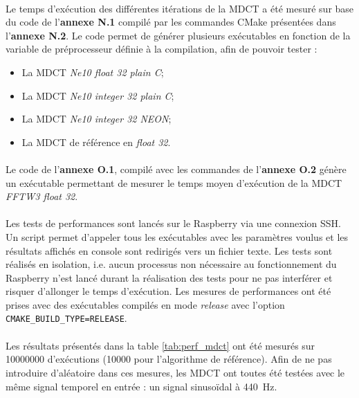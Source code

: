 \documentclass{article}
\begin{document}
    \paragraph{}
    Le temps d'exécution des différentes itérations de la MDCT a été mesuré sur base du code de l'\textbf{annexe N.1} compilé par les commandes CMake présentées dans l'\textbf{annexe N.2}. Le code permet de générer plusieurs exécutables en fonction de la variable de préprocesseur définie à la compilation, afin de pouvoir tester :
    \begin{itemize}
        \item La MDCT \emph{Ne10 float 32 plain C};
        \item La MDCT \emph{Ne10 integer 32 plain C};
        \item La MDCT \emph{Ne10 integer 32 NEON};
        \item La MDCT de référence en \emph{float 32}.
    \end{itemize}

    \paragraph{}
    Le code de l'\textbf{annexe O.1}, compilé avec les commandes de l'\textbf{annexe O.2} génère un exécutable permettant de mesurer le temps moyen d'exécution de la MDCT \emph{FFTW3 float 32}.
    
    \paragraph{}
    Les tests de performances sont lancés sur le Raspberry via une connexion SSH. Un script permet d'appeler tous les exécutables avec les paramètres voulus et les résultats affichés en console sont redirigés vers un fichier texte. Les tests sont réalisés en isolation, i.e. aucun processus non nécessaire au fonctionnement du Raspberry n'est lancé durant la réalisation des tests pour ne pas interférer et risquer d'allonger le temps d'exécution. Les mesures de performances ont été prises avec des exécutables compilés en mode \emph{release} avec l'option \texttt{CMAKE\_BUILD\_TYPE=RELEASE}.

    \paragraph{}
    Les résultats présentés dans la table \ref{tab:perf_mdct} ont été mesurés sur \SI{10000000}{} d'exécutions (\SI{10000}{} pour l'algorithme de référence). Afin de ne pas introduire d'aléatoire dans ces mesures, les MDCT ont toutes été testées avec le même signal temporel en entrée : un signal sinusoïdal à \SI{440}{\hertz}.
\end{document}
